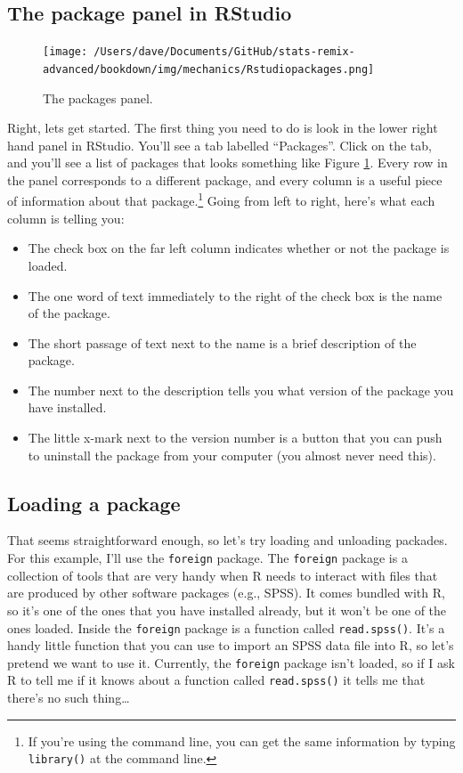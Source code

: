 \documentclass[
]{book}
\providecommand{\tightlist}{%
  \setlength{\itemsep}{0pt}\setlength{\parskip}{0pt}}
\begin{document}
\hypertarget{the-package-panel-in-rstudio}{%
\subsection{The package panel in RStudio}\label{the-package-panel-in-rstudio}}

\begin{figure}
\centering
\texttt{[image: /Users/dave/Documents/GitHub/stats-remix-advanced/bookdown/img/mechanics/Rstudiopackages.png]}
\caption{\label{fig:packagepanel}The packages panel.}
\end{figure}

Right, lets get started. The first thing you need to do is look in the lower right hand panel in RStudio. You'll see a tab labelled ``Packages''. Click on the tab, and you'll see a list of packages that looks something like Figure \ref{fig:packagepanel}. Every row in the panel corresponds to a different package, and every column is a useful piece of information about that package.\footnote{If you're using the command line, you can get the same information by typing \texttt{library()} at the command line.} Going from left to right, here's what each column is telling you:

\begin{itemize}
\tightlist
\item
  The check box on the far left column indicates whether or not the package is loaded.
\item
  The one word of text immediately to the right of the check box is the name of the package.
\item
  The short passage of text next to the name is a brief description of the package.
\item
  The number next to the description tells you what version of the package you have installed.
\item
  The little x-mark next to the version number is a button that you can push to uninstall the package from your computer (you almost never need this).
\end{itemize}

\hypertarget{packageload}{%
\subsection{Loading a package}\label{packageload}}

That seems straightforward enough, so let's try loading and unloading packades. For this example, I'll use the \texttt{foreign} package. The \texttt{foreign} package is a collection of tools that are very handy when R needs to interact with files that are produced by other software packages (e.g., SPSS). It comes bundled with R, so it's one of the ones that you have installed already, but it won't be one of the ones loaded. Inside the \texttt{foreign} package is a function called \texttt{read.spss()}. It's a handy little function that you can use to import an SPSS data file into R, so let's pretend we want to use it. Currently, the \texttt{foreign} package isn't loaded, so if I ask R to tell me if it knows about a function called \texttt{read.spss()} it tells me that there's no such thing\ldots{}
\end{document}
